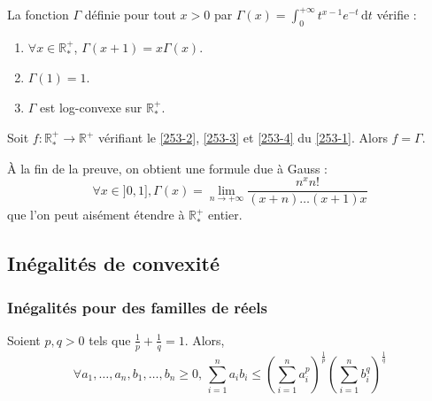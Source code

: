 
  \begin{lemma}
    \label{253-1}
    La fonction $\Gamma$ définie pour tout $x > 0$ par $\Gamma(x) = \int_0^{+\infty} t^{x-1} e^{-t} \, \mathrm{d}t$ vérifie :
    \begin{enumerate}[label={\bfseries(\roman*)}]
      \item \label{253-2} $\forall x \in \mathbb{R}^+_*$, $\Gamma(x+1) = x\Gamma(x)$.
      \item \label{253-3} $\Gamma(1) = 1$.
      \item \label{253-4} $\Gamma$ est log-convexe sur $\mathbb{R}^+_*$.
    \end{enumerate}
  \end{lemma}


  \begin{theorem}
    Soit $f : \mathbb{R}^+_* \rightarrow \mathbb{R}^+$ vérifiant le \cref{253-2}, \cref{253-3} et \cref{253-4} du \cref{253-1}. Alors $f = \Gamma$.
  \end{theorem}

  \begin{remark}
    À la fin de la preuve, on obtient une formule due à Gauss :
    \[ \forall x \in ]0, 1], \Gamma(x) = \lim_{n \rightarrow +\infty} \frac{n^x n!}{(x+n) \dots (x+1)x} \]
    que l'on peut aisément étendre à $\mathbb{R}^+_*$ entier.
  \end{remark}

  \subsection{Inégalités de convexité}

  \subsubsection{Inégalités pour des familles de réels}


  \begin{proposition}
    Soient $p, q > 0$ tels que $\frac{1}{p} + \frac{1}{q} = 1$. Alors,
    \[ \forall a_1, \dots, a_n, b_1, \dots, b_n \geq 0, \, \sum_{i=1}^n a_i b_i \leq \left( \sum_{i=1}^n a_i^p \right)^{\frac{1}{p}} \left( \sum_{i=1}^n b_i^q \right)^{\frac{1}{q}} \]
  \end{proposition}


